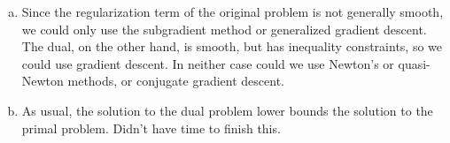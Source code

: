 \documentclass[11pt]{article}
\begin{document}
\begin{enumerate}[(a)]
\item Since the regularization term of the original problem is not generally
smooth, we could only use the subgradient method or generalized gradient
descent. The dual, on the other hand, is smooth, but has inequality
constraints, so we could use gradient descent. In neither case could we use
Newton's or quasi-Newton methods, or conjugate gradient descent.

\item As usual, the solution to the dual problem lower bounds the solution to
the primal problem. Didn't have time to finish this.

\end{enumerate}
\end{document}
